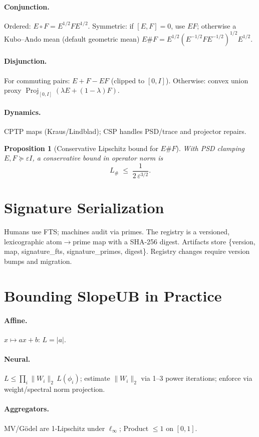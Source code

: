 \documentclass[11pt]{article}
\newtheorem{proposition}{Proposition}
\begin{document}
\paragraph{Conjunction.} Ordered: $E\circ F=E^{1/2}FE^{1/2}$. Symmetric: if $[E,F]=0$, use $EF$; otherwise a Kubo--Ando mean (default geometric mean) $E\#F = E^{1/2}(E^{-1/2}FE^{-1/2})^{1/2}E^{1/2}$.
\paragraph{Disjunction.} For commuting pairs: $E+F-EF$ (clipped to $[0,I]$). Otherwise: convex union proxy $\operatorname{Proj}_{[0,I]}(\lambda E+(1-\lambda)F)$.
\paragraph{Dynamics.} CPTP maps (Kraus/Lindblad); CSP handles PSD/trace and projector repairs.

\begin{proposition}[Conservative Lipschitz bound for $E\#F$]
With PSD clamping $E,F\succeq \varepsilon I$, a conservative bound in operator norm is
\[
L_{\#} \;\le\; \frac{1}{2\,\varepsilon^{3/2}}.
\]
\end{proposition}

\section{Signature Serialization}
Humans use FTS; machines audit via primes. The registry is a versioned, lexicographic atom$\to$prime map with a SHA-256 digest. Artifacts store \{version, map, signature\_fts, signature\_primes, digest\}. Registry changes require version bumps and migration.

\section{Bounding \textsf{SlopeUB} in Practice}
\paragraph{Affine.} $x\mapsto ax+b$: $L=|a|$.
\paragraph{Neural.} $L\le\prod_i\|W_i\|_2\,L(\phi_i)$; estimate $\|W_i\|_2$ via 1–3 power iterations; enforce via weight/spectral norm projection.
\paragraph{Aggregators.} MV/Gödel are 1-Lipschitz under $\ell_\infty$; Product $\le 1$ on $[0,1]$.
\end{document}
